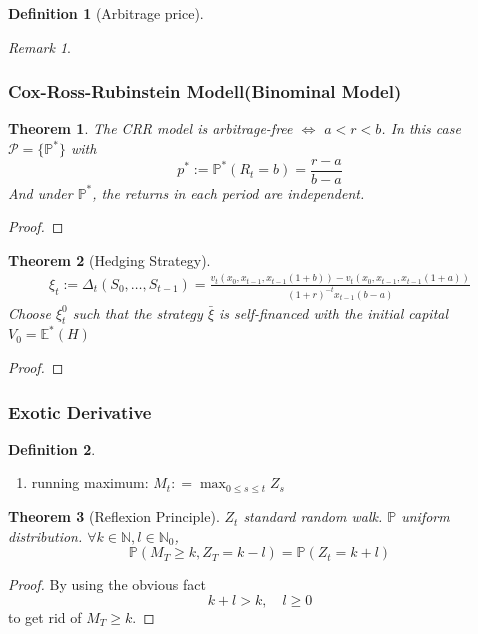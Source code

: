 \documentclass[a4paper,11pt]{book}
\newtheorem{theorem}{Theorem}[section]
\theoremstyle{definition}
\newtheorem{definition}{Definition}[section]
\theoremstyle{remark}
\newtheorem*{remark}{Remark}
\begin{document}
\begin{definition}[Arbitrage price]
\end{definition}
\begin{remark}
\end{remark}


\subsubsection{Cox-Ross-Rubinstein Modell(Binominal Model)}
\begin{theorem}
	\quad \newline
	The CRR model is arbitrage-free $\Leftrightarrow$ $a < r < b$.
	In this case $\mathcal{P} = \{ \mathbb{P}^*\}$ with
	\begin{equation*}
		p^* := \mathbb{P}^*(R_t = b) = \frac{r - a}{b - a}
	\end{equation*} 
	And under $\mathbb{P}^*$, the returns in each period are independent.
\end{theorem}
\begin{proof}
\end{proof}

\begin{theorem}[Hedging Strategy]
	\begin{align*}
		\xi_t := \Delta_t(S_0, \dots, S_{t - 1}) = \frac{v_t(x_0, x_{t - 1}, x_{t-1}(1 + b)) - v_t(x_0, x_{t - 1}, x_{t-1}(1 + a))}{(1 + r)^{-t} x_{t - 1}(b -a)}
	\end{align*}
	Choose $\xi^0_t$ such that the strategy $\bar{\xi}$ is self-financed with the initial capital $V_0 = \mathbb{E}^*(H)$
\end{theorem}
\begin{proof}
\end{proof}


\subsubsection*{Exotic Derivative}
\begin{definition} \quad
	\begin{enumerate}
		\item running maximum: $M_t : = \max_{0 \leq s \leq t} Z_s$
	\end{enumerate}
\end{definition}

\begin{theorem}[Reflexion Principle]
	$Z_t$ standard random walk. $\mathbb{P}$ uniform distribution.
	$\forall k \in \mathbb{N}, l \in \mathbb{N}_0$,
	\begin{equation*}
		\mathbb{P}(M_T \geq k, Z_T = k - l) = \mathbb{P}(Z_t = k + l)
	\end{equation*}
\end{theorem}
\begin{proof}
	By using the obvious fact
	\begin{equation*}
		k+l > k, \quad l \geq 0
	\end{equation*}
	to get rid of $M_T \geq k$. 
\end{proof}
\end{document}
